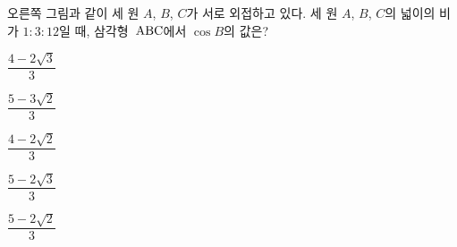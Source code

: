\noindent\begin{minipage}[t]{0.58\linewidth}\vspace{0pt}\raggedright 오른쪽 그림과 같이 세 원 $A$, $B$, $C$가 서로 외접하고 있다. 세 원 $A$, $B$, $C$의 넓이의 비가 $1:3:12$일 때, 삼각형~$\mathrm{ABC}$에서 $\cos B$의 값은?\end{minipage}\hfill\begin{minipage}[t]{0.4\linewidth}\vspace{0pt}\centering \resizebox{\ifdim\width>\linewidth\linewidth\else\width\fi}{!}{}\end{minipage}\par
\begin{choices32}{\rule[-3ex]{0pt}{8ex}$\dfrac{4-2\sqrt{3}}{3}$}{\rule[-3ex]{0pt}{8ex}$\dfrac{5-3\sqrt{2}}{3}$}{\rule[-3ex]{0pt}{8ex}$\dfrac{4-2\sqrt{2}}{3}$}{\rule[-3ex]{0pt}{8ex}$\dfrac{5-2\sqrt{3}}{3}$}{\rule[-3ex]{0pt}{8ex}$\dfrac{5-2\sqrt{2}}{3}$}\end{choices32}
